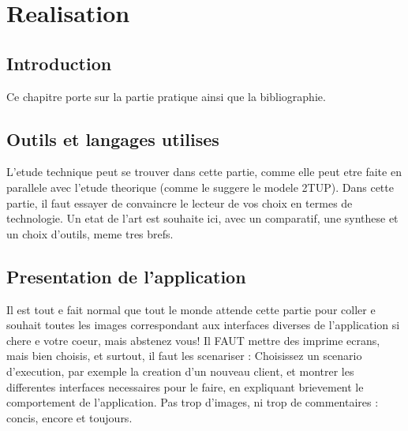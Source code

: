 
\setcounter{chapter}{2}
\chapter{Realisation}
\minitoc %
\graphicspath{{Chapitre3/figures/}}

\pagestyle{fancy}
\fancyhf{}
\fancyhead[R]{\bfseries\rightmark}
\fancyfoot[R]{\thepage}
\renewcommand{\headrulewidth}{0.5pt}
\renewcommand{\footrulewidth}{0pt}
\renewcommand{\chaptermark}[1]{\markboth{\MakeUppercase{\chaptername~\thechapter. #1 }}{}}
\renewcommand{\sectionmark}[1]{\markright{\thechapter.\thesection~ #1}}

\begin{spacing}{1.2}

\section*{Introduction}
Ce chapitre porte sur la partie pratique ainsi que la bibliographie.

\section{Outils et langages utilises}
L'etude technique peut se trouver dans cette partie, comme elle peut etre faite en
parallele avec l'etude theorique (comme le suggere le modele 2TUP).
Dans cette partie, il faut essayer de convaincre le lecteur de vos choix en termes de
technologie. Un etat de l'art est souhaite ici, avec un comparatif, une synthese et un choix 
d'outils, meme tres brefs.
\section{Presentation de l'application}
Il est tout e fait normal que tout le monde attende cette partie pour coller e souhait toutes les images
correspondant aux interfaces diverses de l'application si chere e votre coeur, mais
abstenez vous! Il FAUT mettre des imprime ecrans, mais bien choisis, et surtout, il faut les scenariser : Choisissez un scenario d'execution, par exemple la creation d'un 
nouveau client, et montrer les differentes interfaces necessaires pour le faire, en
expliquant brievement le comportement de l'application. Pas trop d'images, ni trop de
commentaires : concis, encore et toujours.


\end{spacing}
